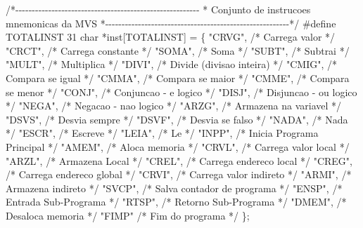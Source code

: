 \documentclass[
  brazilian,
  letterpaper,
]{book}
\newenvironment{Shaded}{\begin{snugshade}}{\end{snugshade}}
\newcommand{\CommentTok}[1]{\textcolor[rgb]{0.37,0.37,0.37}{#1}}
\newcommand{\DataTypeTok}[1]{\textcolor[rgb]{0.68,0.00,0.00}{#1}}
\newcommand{\DecValTok}[1]{\textcolor[rgb]{0.68,0.00,0.00}{#1}}
\newcommand{\NormalTok}[1]{\textcolor[rgb]{0.00,0.23,0.31}{#1}}
\newcommand{\OperatorTok}[1]{\textcolor[rgb]{0.37,0.37,0.37}{#1}}
\newcommand{\PreprocessorTok}[1]{\textcolor[rgb]{0.68,0.00,0.00}{#1}}
\newcommand{\StringTok}[1]{\textcolor[rgb]{0.13,0.47,0.30}{#1}}
\theoremstyle{plain}
\theoremstyle{definition}
\theoremstyle{remark}
\begin{document}
\begin{Shaded}
\begin{Highlighting}[]
\CommentTok{/*{-}{-}{-}{-}{-}{-}{-}{-}{-}{-}{-}{-}{-}{-}{-}{-}{-}{-}{-}{-}{-}{-}{-}{-}{-}{-}{-}{-}{-}{-}{-}{-}{-}{-}{-}{-}{-}{-}{-}{-}{-}{-}{-}{-}{-}{-}{-}{-}{-}{-}{-}{-}{-}{-}{-}{-}}
\CommentTok{ * Conjunto de instrucoes mnemonicas da MVS                    }
\CommentTok{ *{-}{-}{-}{-}{-}{-}{-}{-}{-}{-}{-}{-}{-}{-}{-}{-}{-}{-}{-}{-}{-}{-}{-}{-}{-}{-}{-}{-}{-}{-}{-}{-}{-}{-}{-}{-}{-}{-}{-}{-}{-}{-}{-}{-}{-}{-}{-}{-}{-}{-}{-}{-}{-}{-}{-}{-}*/}
\PreprocessorTok{\#define TOTALINST }\DecValTok{31}
\DataTypeTok{char} \OperatorTok{*}\NormalTok{inst}\OperatorTok{[}\NormalTok{TOTALINST}\OperatorTok{]} \OperatorTok{=} \OperatorTok{\{}
    \StringTok{"CRVG"}\OperatorTok{,} \CommentTok{/* Carrega valor */}
    \StringTok{"CRCT"}\OperatorTok{,} \CommentTok{/* Carrega constante */}
    \StringTok{"SOMA"}\OperatorTok{,} \CommentTok{/* Soma */}
    \StringTok{"SUBT"}\OperatorTok{,} \CommentTok{/* Subtrai */}
    \StringTok{"MULT"}\OperatorTok{,} \CommentTok{/* Multiplica */}
    \StringTok{"DIVI"}\OperatorTok{,} \CommentTok{/* Divide (divisao inteira) */}
    \StringTok{"CMIG"}\OperatorTok{,} \CommentTok{/* Compara se igual */}
    \StringTok{"CMMA"}\OperatorTok{,} \CommentTok{/* Compara se maior */}
    \StringTok{"CMME"}\OperatorTok{,} \CommentTok{/* Compara se menor */}
    \StringTok{"CONJ"}\OperatorTok{,} \CommentTok{/* Conjuncao {-} e logico */}
    \StringTok{"DISJ"}\OperatorTok{,} \CommentTok{/* Disjuncao {-} ou logico */}
    \StringTok{"NEGA"}\OperatorTok{,} \CommentTok{/* Negacao {-} nao logico */}
    \StringTok{"ARZG"}\OperatorTok{,} \CommentTok{/* Armazena na variavel */}
    \StringTok{"DSVS"}\OperatorTok{,} \CommentTok{/* Desvia sempre */}
    \StringTok{"DSVF"}\OperatorTok{,} \CommentTok{/* Desvia se falso */}
    \StringTok{"NADA"}\OperatorTok{,} \CommentTok{/* Nada */}
    \StringTok{"ESCR"}\OperatorTok{,} \CommentTok{/* Escreve */}
    \StringTok{"LEIA"}\OperatorTok{,} \CommentTok{/* Le */}
    \StringTok{"INPP"}\OperatorTok{,} \CommentTok{/* Inicia Programa Principal */}
    \StringTok{"AMEM"}\OperatorTok{,} \CommentTok{/* Aloca memoria */}
    \StringTok{"CRVL"}\OperatorTok{,} \CommentTok{/* Carrega valor local */}
    \StringTok{"ARZL"}\OperatorTok{,} \CommentTok{/* Armazena Local */}
    \StringTok{"CREL"}\OperatorTok{,} \CommentTok{/* Carrega endereco local */}
    \StringTok{"CREG"}\OperatorTok{,} \CommentTok{/* Carrega endereco global */}
    \StringTok{"CRVI"}\OperatorTok{,} \CommentTok{/* Carrega valor indireto */}
    \StringTok{"ARMI"}\OperatorTok{,} \CommentTok{/* Armazena indireto */}
    \StringTok{"SVCP"}\OperatorTok{,} \CommentTok{/* Salva contador de programa */}
    \StringTok{"ENSP"}\OperatorTok{,} \CommentTok{/* Entrada Sub{-}Programa */}
    \StringTok{"RTSP"}\OperatorTok{,} \CommentTok{/* Retorno Sub{-}Programa */}
    \StringTok{"DMEM"}\OperatorTok{,} \CommentTok{/* Desaloca memoria */}
    \StringTok{"FIMP"}  \CommentTok{/* Fim do programa */}
\OperatorTok{\};}


\end{Highlighting}
\end{Shaded}
\end{document}

